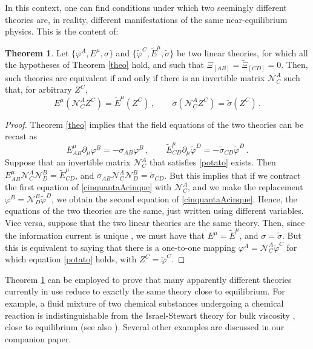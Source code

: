 \documentclass[aps,prl,singlecolumn,nofootinbib]{revtex4-2}
\theoremstyle{definition}
\theoremstyle{theorem}
\newtheorem{theorem}{Theorem}
\begin{document}
In this context,  one can find conditions under which two seemingly different theories are, in reality, different manifestations of the same near-equilibrium physics. This is the content of:  
\begin{theorem}\label{theo2}
Let $\{\varphi^A, E^\mu,\sigma \}$ and $\{\tilde{\varphi}^C, \tilde{E}^\mu,\tilde{\sigma} \}$ be two linear theories, for which all the hypotheses of Theorem \ref{theo} hold, and such that $\Xi_{[AB]}=\tilde{\Xi}_{[CD]}=0$. Then, such theories are equivalent if and only if there is an invertible matrix $\mathcal{N}^A_C$ such that, for arbitrary $Z^C$,
\begin{equation}\label{potato}
E^\mu(\mathcal{N}^A_C Z^C)=\tilde{E}^\mu(Z^C) \,,\qquad   \sigma(\mathcal{N}^A_C Z^C)= \tilde{\sigma}(Z^C) \,.
\end{equation}
\end{theorem}
\begin{proof}
Theorem \ref{theo} implies that the field equations of the two theories can be recast as
\begin{equation}\label{cinquantaAcinque}
E^\mu_{AB} \partial_\mu \varphi^B = -\sigma_{AB} \varphi^B \, ,\qquad 
\tilde{E}^\mu_{CD} \partial_\mu \tilde{\varphi}^D = -\tilde{\sigma}_{CD} \tilde{\varphi}^D \, .
\end{equation}
Suppose that an invertible matrix $\mathcal{N}^A_C$ that satisfies \eqref{potato} exists. Then $E^\mu_{AB}\mathcal{N}^A_C \mathcal{N}^B_D=\tilde{E}^\mu_{CD}$, and $\sigma_{AB}\mathcal{N}^A_C \mathcal{N}^B_D=\tilde{\sigma}_{CD}$. But this implies that if we contract the first equation of \eqref{cinquantaAcinque} with $\mathcal{N}^A_C$, and we make the replacement $\varphi^B=\mathcal{N}^B_D \tilde{\varphi}^D$, we obtain the second equation of \eqref{cinquantaAcinque}. Hence, the equations of the two theories are the same, just written using different variables. Vice versa, suppose that the two linear theories are the same theory. Then, since the information current is unique \cite{GavassinoCausality2021}, we must have that $E^\mu = \tilde{E}^\mu$, and $\sigma=\tilde{\sigma}$. But this is equivalent to saying that there is a one-to-one mapping $\varphi^A =\mathcal{N}^A_C \tilde{\varphi}^C$ for which equation \eqref{potato} holds, with $Z^C=\tilde{\varphi}^C$.
\end{proof}

Theorem \ref{theo2} can be employed to prove that many apparently different theories currently in use reduce to exactly the same theory close to equilibrium. For example, a fluid mixture of two chemical substances undergoing a chemical reaction is indistinguishable from the Israel-Stewart theory for bulk viscosity \cite{Causality_bulk}, close to equilibrium (see also \cite{BulkGavassino,Camelio2022,CamelioSimulations2022}). Several other examples are discussed in our companion paper.\\
\end{document}
